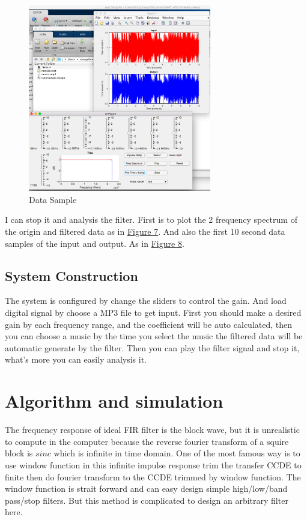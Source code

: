 \documentclass[titlepage]{article}
\begin{document}
\begin{figure}[htbp]
\caption{\label{fig:org085161d}
Data Sample}
\centering
\includegraphics[width=8cm]{./img/7.png}
\end{figure}
I can stop it and analysis the filter. First is to plot the 2 frequency
spectrum of the origin and filtered data as in \hyperref[fig:org2a0d4f2]{Figure 7}. And also the first 10 second data
samples of the input and output. As in \hyperref[fig:org085161d]{Figure 8}.

\subsection{System Construction}
\label{sec:org6a89275}
The system is configured by change the sliders to control the gain. And load
digital signal by choose a MP3 file to get input. First you should make a
desired gain by each frequency range, and the coefficient will be auto
calculated, then you can choose a music by the time you select the music the
filtered data will be automatic generate by the filter. Then you can play the
filter signal and stop it, what's more you can easily analysis it.

\section{Algorithm and simulation}
\label{sec:org5faee99}
The frequency response of ideal FIR filter is the block wave, but it is
unrealistic to compute in the computer because the reverse fourier transform
of a squire block is \(sinc\) which is infinite in time domain. One of the most
famous way is to use window function in this infinite impulse response trim
the transfer CCDE to finite then do fourier transform to the CCDE trimmed by
window function. The window function is strait forward and can easy design
simple high/low/band pass/stop filters. But this method is complicated to
design an arbitrary filter here.
\end{document}
